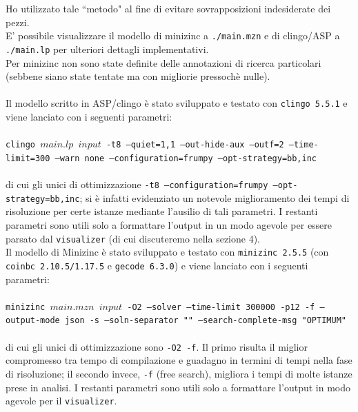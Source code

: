 \documentclass{article}
\begin{document}
Ho utilizzato tale ``metodo" al fine di evitare sovrapposizioni indesiderate dei pezzi. \\
E' possibile visualizzare il modello di minizinc a \texttt{./main.mzn} e di clingo/ASP a \texttt{./main.lp} per ulteriori dettagli implementativi.\\
Per minizinc non sono state definite delle annotazioni di ricerca particolari (sebbene siano state tentate ma con migliorie pressoch\`e nulle).\\\\
Il modello scritto in ASP/clingo è stato sviluppato e testato con \texttt{clingo 5.5.1} e viene lanciato con i seguenti parametri:\\\\
\hspace*{.5cm}\texttt{clingo $main.lp$ $input$ -t8 --quiet=1,1 --out-hide-aux --outf=2 --time-limit=300 --warn none --configuration=frumpy --opt-strategy=bb,inc}\\\\
di cui gli unici di ottimizzazione \texttt{-t8 --configuration=frumpy --opt-strategy=bb,inc}; si è infatti evidenziato un notevole miglioramento dei tempi di risoluzione per certe istanze mediante l'ausilio di tali parametri. I restanti parametri sono utili solo a formattare l'output in un modo agevole per essere parsato dal \texttt{visualizer} (di cui discuteremo nella sezione 4).\\
Il modello di Minizinc è stato sviluppato e testato con \texttt{minizinc 2.5.5} (con \texttt{coinbc 2.10.5/1.17.5} e \texttt{gecode 6.3.0}) e viene lanciato con i seguenti parametri:\\\\
\hspace*{.5cm}\texttt{minizinc $main.mzn$ $input$ -O2 --solver {} --time-limit 300000 -p12 -f --output-mode json -s --soln-separator "" --search-complete-msg "OPTIMUM"}\\\\
di cui gli unici di ottimizzazione sono \texttt{-O2 -f}. Il primo risulta il miglior compromesso tra tempo di compilazione e guadagno in termini di tempi nella fase di risoluzione; il secondo invece, \texttt{-f} (free search), migliora i tempi di molte istanze prese in analisi. I restanti parametri sono utili solo a formattare l'output in modo agevole per il \texttt{visualizer}.
\end{document}
